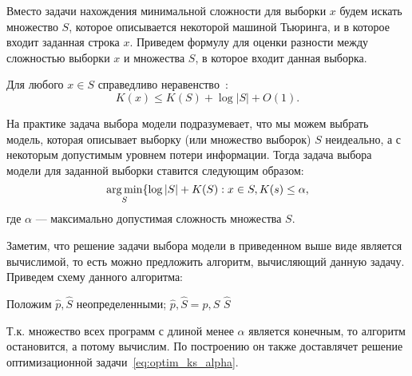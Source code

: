 \documentclass[../main.tex]{subfiles}
\begin{document}
Вместо задачи нахождения минимальной сложности для выборки $x$ будем искать множество $S$, которое описывается некоторой машиной Тьюринга, и в которое входит заданная строка $x$. Приведем формулу для оценки разности между сложностью выборки $x$ и множества $S$, в которое входит данная выборка.
\begin{theorembd}
Для любого $x \in S$ справедливо неравенство~\cite{ks_struct}:
\[
	K(x) \leq K(S)  + \log |S| + O(1).
\]
\end{theorembd}

На практике задача выбора модели подразумевает, что мы можем выбрать модель, которая описывает выборку (или множество выборок) $S$ неидеально, а с некоторым допустимым уровнем потери информации.
Тогда задача выбора модели для заданной выборки ставится следующим образом:
\begin{equation}
\label{eq:optim_ks_alpha}
	\operatorname*{arg\,min}_{S} \{\log|S| + K(S): x \in S, K(s) \leq \alpha,
\end{equation}
где $\alpha$ --- максимально допустимая сложность множества $S$.

\begin{figure}
\centering
{}

\caption{}
\end{figure}


Заметим, что решение задачи выбора модели в приведенном выше виде является вычислимой, то есть можно предложить алгоритм, вычисляющий данную задачу. Приведем схему данного алгоритма:
\begin{algorithmic}
\STATE Положим $\hat{p}, \hat{S}$ неопределенными;
\STATE  $\hat{p}, \hat{S} = p, S$
\ENDIF
\ENDFOR
\RETURN $\hat{S}$

\end{algorithmic}

Т.к. множество всех программ с длиной менее $\alpha$ является конечным, то алгоритм остановится, а потому вычислим. По построению он также доставлячет решение оптимизационной задачи~\eqref{eq:optim_ks_alpha}.
\end{document}
